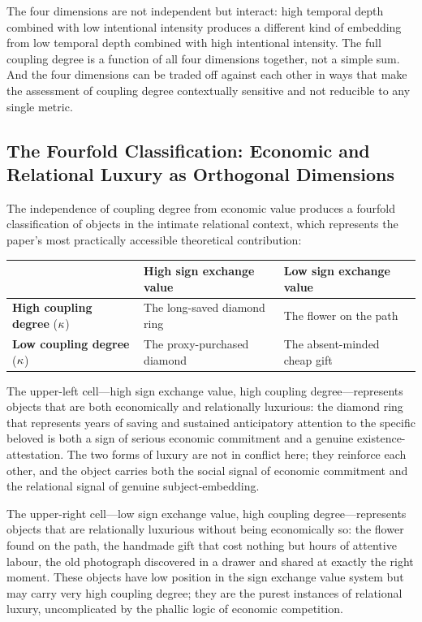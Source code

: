 The four dimensions are not independent but interact: high temporal depth combined with low intentional intensity produces a different kind of embedding from low temporal depth combined with high intentional intensity. The full coupling degree is a function of all four dimensions together, not a simple sum. And the four dimensions can be traded off against each other in ways that make the assessment of coupling degree contextually sensitive and not reducible to any single metric.

\subsection{The Fourfold Classification: Economic and Relational Luxury as Orthogonal Dimensions}
\label{p16:subsec:fourfold}

\noindent
The independence of coupling degree from economic value produces a fourfold classification of objects in the intimate relational context, which represents the paper's most practically accessible theoretical contribution:

\vspace{0.6em}
\begin{center}
\begin{tabular}{lll}
\toprule
& \textbf{High sign exchange value} & \textbf{Low sign exchange value} \\
\midrule
\textbf{High coupling degree} ($\kappa$) & The long-saved diamond ring & The flower on the path \\
\textbf{Low coupling degree} ($\kappa$) & The proxy-purchased diamond & The absent-minded cheap gift \\
\bottomrule
\end{tabular}
\end{center}
\vspace{0.6em}

The upper-left cell---high sign exchange value, high coupling degree---represents objects that are both economically and relationally luxurious: the diamond ring that represents years of saving and sustained anticipatory attention to the specific beloved is both a sign of serious economic commitment and a genuine existence-attestation. The two forms of luxury are not in conflict here; they reinforce each other, and the object carries both the social signal of economic commitment and the relational signal of genuine subject-embedding.

The upper-right cell---low sign exchange value, high coupling degree---represents objects that are relationally luxurious without being economically so: the flower found on the path, the handmade gift that cost nothing but hours of attentive labour, the old photograph discovered in a drawer and shared at exactly the right moment. These objects have low position in the sign exchange value system but may carry very high coupling degree; they are the purest instances of relational luxury, uncomplicated by the phallic logic of economic competition.

